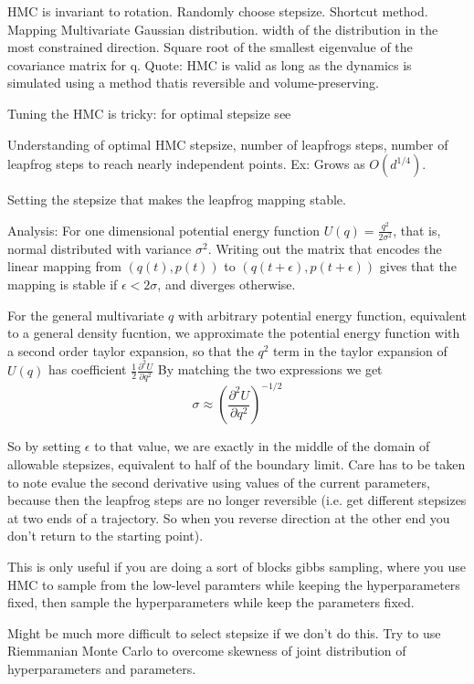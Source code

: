\documentclass{book}
\begin{document}
\begin{enumerate}
HMC is invariant to rotation.
Randomly choose stepsize. 
Shortcut method.
Mapping Multivariate Gaussian distribution. width of the distribution in the most constrained direction. Square root of the smallest eigenvalue of the covariance matrix for q.
Quote: HMC is valid as long as the dynamics is simulated using a method thatis reversible and volume-preserving. 

Tuning the HMC is tricky: for optimal stepsize see \cite{beskos2013optimal}

Understanding of optimal HMC stepsize, number of leapfrogs steps, number of leapfrog steps to reach nearly independent points.
Ex: Grows as $O(d^{1/4})$.

Setting the stepsize that makes the leapfrog mapping stable.

Analysis: For one dimensional potential energy function $U(q) = \frac{q^2}{2\sigma^2}$,
that is, normal distributed with variance $\sigma^2$. Writing out the matrix that encodes the linear mapping from $(q(t),p(t))$ to $(q(t+\epsilon),p(t+\epsilon))$ gives that the mapping is stable if $\epsilon < 2 \sigma$, and diverges otherwise. 

For the general multivariate $q$ with arbitrary potential energy function, equivalent to a general density fucntion, we approximate the potential energy function with a second order taylor expansion, so that the $q^2$ term in the taylor expansion of $U(q)$ has coefficient $\frac{1}{2} \frac{\partial^2 U}{\partial q^2}$  
By matching the two expressions we get 
\[ \sigma \approx ( \frac{\partial^2 U}{\partial q^2})^{-1/2} \]

So by setting $\epsilon$ to that value, we are exactly in the middle of the domain of allowable stepsizes, equivalent to half of the boundary limit.
Care has to be taken to note evalue the second derivative using values of the current parameters, because then the leapfrog steps are no longer reversible (i.e. get different stepsizes at two ends of a trajectory. So when you reverse direction at the other end you don't return to  the starting point). 

This is only useful if you are doing a sort of blocks gibbs sampling, where you use HMC to sample from the low-level paramters while keeping the hyperparameters fixed, then sample the hyperparameters while keep the parameters fixed. 

Might be much more difficult to select stepsize if we don't do this. Try to use Riemmanian Monte Carlo to overcome skewness of joint distribution of hyperparameters and parameters. 


\end{enumerate}
\end{document}
